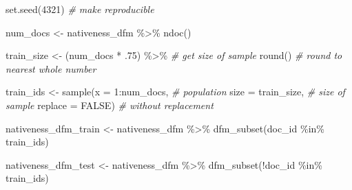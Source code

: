\documentclass[
]{article}
\newenvironment{Shaded}{\begin{snugshade}}{\end{snugshade}}
\newcommand{\AttributeTok}[1]{\textcolor[rgb]{0.77,0.63,0.00}{#1}}
\newcommand{\CommentTok}[1]{\textcolor[rgb]{0.56,0.35,0.01}{\textit{#1}}}
\newcommand{\ConstantTok}[1]{\textcolor[rgb]{0.00,0.00,0.00}{#1}}
\newcommand{\DecValTok}[1]{\textcolor[rgb]{0.00,0.00,0.81}{#1}}
\newcommand{\FunctionTok}[1]{\textcolor[rgb]{0.00,0.00,0.00}{#1}}
\newcommand{\NormalTok}[1]{#1}
\newcommand{\OtherTok}[1]{\textcolor[rgb]{0.56,0.35,0.01}{#1}}
\newcommand{\SpecialCharTok}[1]{\textcolor[rgb]{0.00,0.00,0.00}{#1}}
\begin{document}
\begin{Shaded}
\begin{Highlighting}[]
\FunctionTok{set.seed}\NormalTok{(}\DecValTok{4321}\NormalTok{) }\CommentTok{\# make reproducible}

\NormalTok{num\_docs }\OtherTok{\textless{}{-}} 
\NormalTok{  nativeness\_dfm }\SpecialCharTok{\%\textgreater{}\%} 
  \FunctionTok{ndoc}\NormalTok{()}

\NormalTok{train\_size }\OtherTok{\textless{}{-}} 
\NormalTok{  (num\_docs }\SpecialCharTok{*}\NormalTok{ .}\DecValTok{75}\NormalTok{) }\SpecialCharTok{\%\textgreater{}\%} \CommentTok{\# get size of sample}
  \FunctionTok{round}\NormalTok{() }\CommentTok{\# round to nearest whole number}

\NormalTok{train\_ids }\OtherTok{\textless{}{-}} \FunctionTok{sample}\NormalTok{(}\AttributeTok{x =} \DecValTok{1}\SpecialCharTok{:}\NormalTok{num\_docs, }\CommentTok{\# population}
                   \AttributeTok{size =}\NormalTok{ train\_size, }\CommentTok{\# size of sample}
                   \AttributeTok{replace =} \ConstantTok{FALSE}\NormalTok{) }\CommentTok{\# without replacement}
\end{Highlighting}
\end{Shaded}

\begin{Shaded}
\begin{Highlighting}[]
\NormalTok{nativeness\_dfm\_train }\OtherTok{\textless{}{-}}\NormalTok{ nativeness\_dfm }\SpecialCharTok{\%\textgreater{}\%}
    \FunctionTok{dfm\_subset}\NormalTok{(doc\_id }\SpecialCharTok{\%in\%}\NormalTok{ train\_ids)}

\NormalTok{nativeness\_dfm\_test }\OtherTok{\textless{}{-}}\NormalTok{ nativeness\_dfm }\SpecialCharTok{\%\textgreater{}\%}
    \FunctionTok{dfm\_subset}\NormalTok{(}\SpecialCharTok{!}\NormalTok{doc\_id }\SpecialCharTok{\%in\%}\NormalTok{ train\_ids)}
\end{Highlighting}
\end{Shaded}
\end{document}
